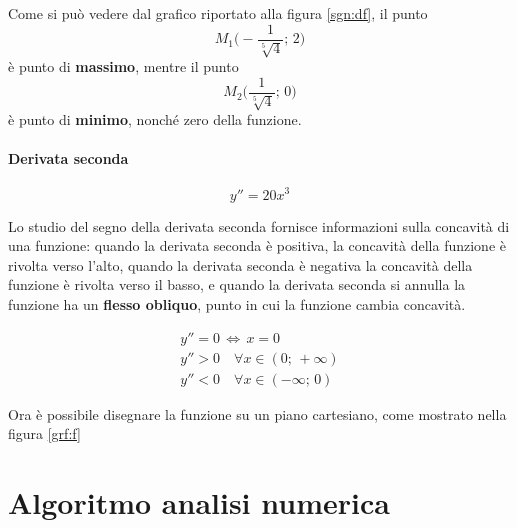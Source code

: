 Come si può vedere dal grafico riportato alla figura \ref{sgn:df}, il punto
\[M_1\Bigg(-\frac{1}{\sqrt[5]{4}};\, 2\Bigg)\]
è punto di \textbf{massimo}, mentre il punto
\[
M_2\Bigg(\frac{1}{\sqrt[5]{4}};\,0\Bigg)
\]
è punto di \textbf{minimo}, nonché zero della funzione.

\subsubsection*{Derivata seconda}
\[
y''=20x^3
\]

Lo studio del segno della derivata seconda fornisce informazioni sulla concavità di una funzione: quando la derivata seconda è positiva, la concavità della funzione è rivolta verso l'alto, quando la derivata seconda è negativa la concavità della funzione è rivolta verso il basso, e quando la derivata seconda si annulla la funzione ha un \textbf{flesso obliquo}, punto in cui la funzione cambia concavità.

\begin{gather*}
y''=0 \,\iff\, x=0\\
y''>0\quad\forall x\in (0;\,+\infty)\\
y''<0\quad\forall x\in (-\infty;\,0)
\end{gather*}

Ora è possibile disegnare la funzione su un piano cartesiano, come mostrato nella figura \ref{grf:f}

\begin{figure}
\end{figure}

\chapter{Algoritmo analisi numerica}

